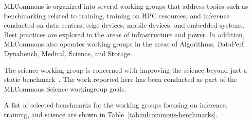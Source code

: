 \documentclass[utf8]{FrontiersinVancouver} %
\begin{document}
MLCommons is organized into several working groups that address topics
such as benchmarking related to training, training on HPC resources,
and inference conducted on data centers, edge devices, mobile devices,
and embedded systems. Best practices are explored in the areas of
infrastructure and power. In addition, MLCommons also operates working
groups in the areas of Algorithms, DataPerf Dynabench, Medical,
Science, and Storage.

The science working group is concerned with improving the science
beyond just a static benchmark~\citep{las-22-mlcommons-science}.  The
work reported here has been conducted as part of the MLCommons Science
workingroup goals.

A list of selected benchmarks for the working groups focusing on
inference, training, and science are shown in
Table~\ref{tab:mlcommons-benchmarks}.
\end{document}
